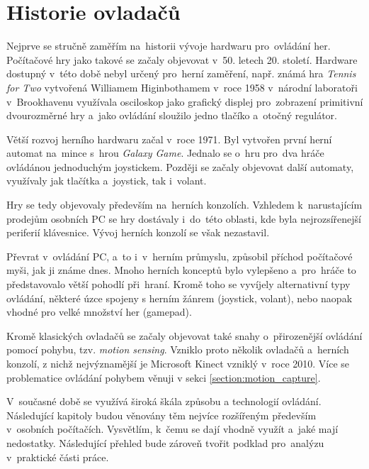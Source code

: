\documentclass[thesis=B,czech,hidelinks]{FITthesis}[2012/06/26] %
\begin{document}

\section{Historie ovladačů}

Nejprve se stručně zaměřím na~historii vývoje hardwaru pro~ovládání her. Počítačové hry jako takové se začaly objevovat v~50. letech 20. století. Hardware dostupný v~této době nebyl určený pro~herní zaměření, např. známá hra \textit{Tennis for Two} vytvořená Williamem Higinbothamem v~roce 1958 v~národní laboratoři v~Brookhavenu využívala osciloskop jako grafický displej pro~zobrazení primitivní dvourozměrné hry a~jako ovládání sloužilo jedno tlačíko a~otočný regulátor.\cite{gamevshardware}

Větší rozvoj herního hardwaru začal v~roce 1971. Byl vytvořen první herní automat na~mince s~hrou \textit{Galaxy Game}. Jednalo se o~hru pro~dva hráče ovládánou jednoduchým joystickem. Později se začaly objevovat další automaty, využívaly jak tlačítka a~joystick, tak i~volant.

Hry se tedy objevovaly především na~herních konzolích. Vzhledem k~narustajícím prodejům osobních PC se hry dostávaly i~do~této oblasti, kde byla nejrozsířenejší periferií klávesnice. Vývoj herních konzolí se však nezastavil.

Převrat v~ovládání PC, a~to i~v~herním průmyslu, způsobil příchod počítačové myši, jak ji známe dnes. Mnoho herních konceptů bylo vylepšeno a~pro~hráče to představovalo větší pohodlí při~hraní. \cite{gamevshardware} Kromě toho se vyvíjely alternativní typy ovládání, některé úzce spojeny s herním žánrem (joystick, volant), nebo naopak vhodné pro velké množství her (gamepad).

Kromě klasických ovladačů se začaly objevovat také snahy o~přirozenější ovládání pomocí pohybu, tzv. \textit{motion sensing}. Vzniklo proto několik ovladačů a~herních konzolí, z nichž nejvýznamější je Microsoft Kinect vzniklý v~roce 2010.\cite{wikicontrollers} Více se problematice ovládání pohybem věnuji v sekci \ref{section:motion_capture}.

V~současné době se využívá široká škála způsobu a technologií ovládání. Následující kapitoly budou věnovány těm nejvíce rozšířeným především v~osobních počítačích. Vysvětlím, k~čemu se dají vhodně využít a~jaké mají nedostatky. Následující přehled bude zároveň tvořit podklad pro~analýzu v~praktické části práce.
\end{document}
